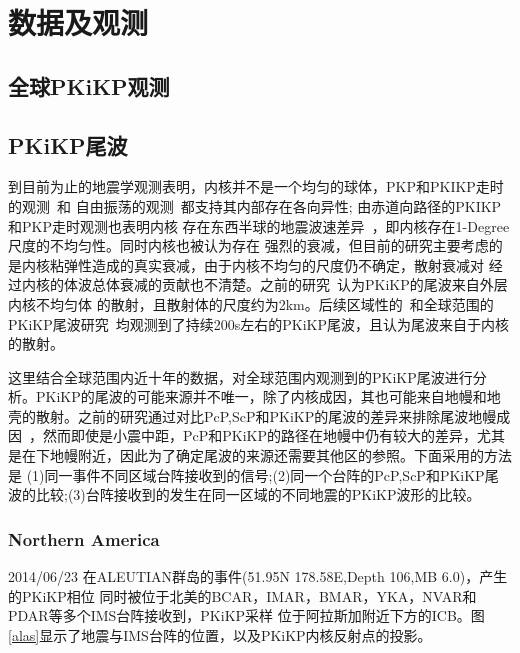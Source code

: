 \chapter{数据及观测}


\section{全球PKiKP观测}


\newpage

\section{PKiKP尾波}


到目前为止的地震学观测表明，内核并不是一个均匀的球体，PKP和PKIKP走时的观测~\citep{Creager1992}和
自由振荡的观测~\citep{Tromp1993}都支持其内部存在各向异性; 由赤道向路径的PKIKP和PKP走时观测也表明内核
存在东西半球的地震波速差异~\citep{Tanaka1997}，即内核存在1-Degree尺度的不均匀性。同时内核也被认为存在
强烈的衰减，但目前的研究主要考虑的是内核粘弹性造成的真实衰减，由于内核不均匀的尺度仍不确定，散射衰减对
经过内核的体波总体衰减的贡献也不清楚。之前的研究~\citep{Vidale2000}认为PKiKP的尾波来自外层内核不均匀体
的散射，且散射体的尺度约为2km。后续区域性的~\citep{Poupinet2004}和全球范围的PKiKP尾波研究~\citep{Koper2004}均观测到了持续200s左右的PKiKP尾波，且认为尾波来自于内核的散射。

这里结合全球范围内近十年的数据，对全球范围内观测到的PKiKP尾波进行分析。PKiKP的尾波的可能来源并不唯一，除了内核成因，其也可能来自地幔和地壳的散射。之前的研究通过对比PcP,ScP和PKiKP的尾波的差异来排除尾波地幔成因~\citep{Koper2004}，然而即使是小震中距，PcP和PKiKP的路径在地幔中仍有较大的差异，尤其是在下地幔附近，因此为了确定尾波的来源还需要其他区的参照。下面采用的方法是
(1)同一事件不同区域台阵接收到的信号;(2)同一个台阵的PcP,ScP和PKiKP尾波的比较;(3)台阵接收到的发生在同一区域的不同地震的PKiKP波形的比较。

\subsection{Northern America}

2014/06/23 在ALEUTIAN群岛的事件(51.95N 178.58E,Depth 106,MB 6.0)，产生的PKiKP相位
同时被位于北美的BCAR，IMAR，BMAR，YKA，NVAR和PDAR等多个IMS台阵接收到，PKiKP采样
位于阿拉斯加附近下方的ICB。图\ref{alas}显示了地震与IMS台阵的位置，以及PKiKP内核反射点的投影。

